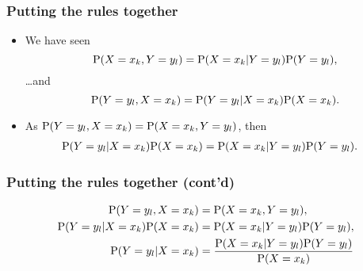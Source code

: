 \documentclass[10pt,xcolor=dvipsnames,serif,professionalfont]{beamer} %
\begin{document}
\begin{frame}
\frametitle{Putting the rules together}
\begin{itemize}
\item We have seen
\begin{equation*}
\mathrm{P}( X=x_k,Y=y_l ) = \mathrm{P}( X=x_k\vert Y=y_l )\mathrm{P}( Y=y_l ),
\end{equation*}
\ldots and 
\begin{equation*}
\mathrm{P}( Y=y_l,X=x_k ) = \mathrm{P}( Y=y_l \vert X=x_k )\mathrm{P}( X=x_k ).
\end{equation*}
\item As $\mathrm{P}( Y=y_l,X=x_k ) = \mathrm{P}( X=x_k,Y=y_l )$, then
\begin{align*}
\mathrm{P}( Y=y_l \vert X=x_k )\mathrm{P}( X=x_k ) &= \mathrm{P}( X=x_k\vert Y=y_l )\mathrm{P}( Y=y_l ).
\end{align*}
%
\end{itemize}
\end{frame}

\begin{frame}
\frametitle{Putting the rules together (cont'd)}
\begin{align*}
\mathrm{P}( Y=y_l,X=x_k ) &= \mathrm{P}( X=x_k,Y=y_l ),\\
\mathrm{P}( Y=y_l \vert X=x_k )\mathrm{P}( X=x_k ) &= \mathrm{P}( X=x_k\vert Y=y_l )\mathrm{P}( Y=y_l ),\\
\mathrm{P}( Y=y_l \vert X=x_k ) &= \frac{ \mathrm{P}( X=x_k\vert Y=y_l )\mathrm{P}( Y=y_l ) } { \mathrm{P}( X=x_k ) }
\end{align*}
\end{frame}
\end{document}
